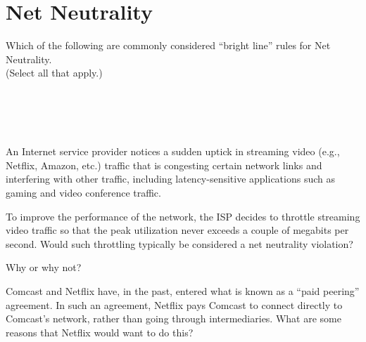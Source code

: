 \section*{Net Neutrality}

 Which of the following are commonly considered ``bright line'' rules
for Net Neutrality.\\ (Select all that apply.)\\
 \\
\\
\\
\\
\eprob


 An Internet service provider notices a sudden uptick in streaming
video (e.g., Netflix, Amazon, etc.) traffic that is congesting certain network
links and interfering with other traffic, including latency-sensitive
applications such as gaming and video conference traffic.

To improve the performance of the network, the ISP decides to throttle
streaming video traffic so that the peak utilization never exceeds a couple of
megabits per second.  Would such throttling typically be considered a net
neutrality violation?
\yesnono
\eprob

 Why or why not? \\
 \eprob

\pagebreak
{} Comcast and Netflix have, in the past, entered what is known as a
``paid peering'' agreement.  In such an agreement, Netflix pays Comcast to
connect directly to Comcast's network, rather than going through
intermediaries.  What are some reasons that Netflix would want to do this?\\
\\
\\
\\
\\
\eprob


